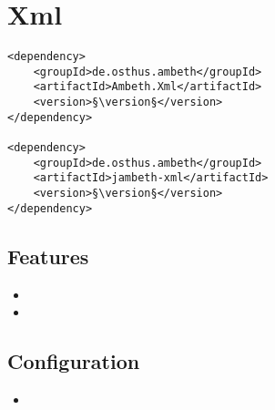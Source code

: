 \section{Xml}
\label{module:Xml}
\ClearAPI
\TODO
\begin{lstlisting}[style=POM,caption={Maven modules to use \emph{Ambeth Xml}}]
<dependency>
	<groupId>de.osthus.ambeth</groupId>
	<artifactId>Ambeth.Xml</artifactId>
	<version>§\version§</version>
</dependency>

<dependency>
	<groupId>de.osthus.ambeth</groupId>
	<artifactId>jambeth-xml</artifactId>
	<version>§\version§</version>
</dependency>
\end{lstlisting}
\subsection{Features}
\begin{itemize}
	\item {}
	\item {}
\end{itemize}

\subsection{Configuration}
\begin{itemize}
	\item {}
\end{itemize}
